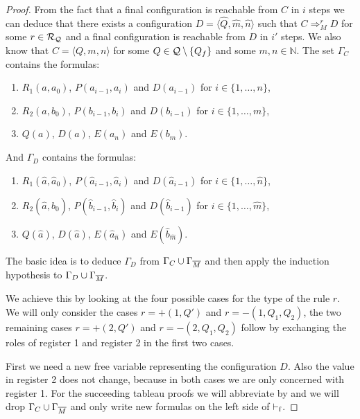 \begin{proof}
	From the fact that a final configuration is reachable from $C$ in $i$ steps we can deduce that there exists a configuration $D=\langle \widehat{Q}, \widehat{m}, \widehat{n}\rangle$ such that $C\Rightarrow_M^r D$ for some $r\in\mathcal{R}_{\mathcal{Q}}$ and a final configuration is reachable from $D$ in $i'$ steps. We also know that $C=\langle Q,m,n\rangle$ for some $Q\in\mathcal{Q}\setminus\{Q_f\}$ and some $m,n\in\mathbb{N}$.
	The set $\Gamma_C$ contains the formulas: 
	\begin{enumerate}[label=]%
		\item $R_1(a,a_0)$, $P(a_{i-1},a_i)$ and $D(a_{i-1})$ for $i\in\{1,\dots,n\}$,
		\item $R_2(a,b_0)$, $P(b_{i-1},b_i)$ and $D(b_{i-1})$ for $i\in\{1,\dots,m\}$,
		\item $Q(a)$, $D(a)$, $E(a_n)$ and $E(b_m)$.
	\end{enumerate}
	And $\Gamma_D$ contains the formulas:
	\begin{enumerate}[label=]
		\item $R_1(\widehat{a},\widehat{a}_0)$, $P(\widehat{a}_{i-1},\widehat{a}_i)$ and $D(\widehat{a}_{i-1})$ for $i\in\{1,\dots,\widehat{n}\}$,
		\item $R_2(\widehat{a},\widehat{b}_0)$, $P(\widehat{b}_{i-1},\widehat{b}_i)$ and $D(\widehat{b}_{i-1})$ for $i\in\{1,\dots,\widehat{m}\}$,
		\item $Q(\widehat{a})$, $D(\widehat{a})$, $E({\widehat{a}}_{\widehat{n}})$ and $E({\widehat{b}}_{\widehat{m}})$.
	\end{enumerate}
	The basic idea is to deduce $\Gamma_D$ from $\Gamma_C\cup\Gamma_{\overline{M}}$ and then apply the induction hypothesis to $\Gamma_D\cup\Gamma_{\overline{M}}$. 
	\begin{figure}[H]
		\centering
		
	\end{figure}
	
	We achieve this by looking at the four possible cases for the type of the rule $r$. We will only consider the cases $r=+(1,Q')$ and $r=-(1,Q_1,Q_2)$, the two remaining cases $r=+(2,Q')$ and $r=-(2,Q_1,Q_2)$ follow by exchanging the roles of register 1 and register 2 in the first two cases.
	
	First we need a new free variable representing the configuration $D$. Also the value in register 2 does not change, because in both cases we are only concerned with register 1.
	For the succeeding tableau proofs we will abbreviate \false{} by \falses{} and we will drop $\Gamma_C\cup\Gamma_{\overline{M}}$ and only write new formulas on the left side of $\vdash_\text{f}$.
	

\end{proof}
